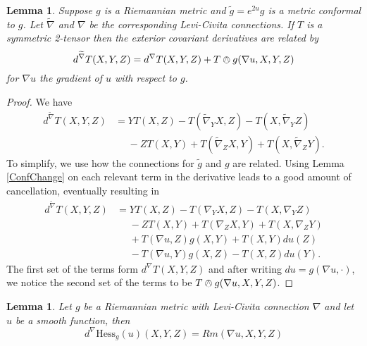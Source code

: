 \documentclass{amsart}
\newtheorem{lem}[thm]{Lemma}
\begin{document}
\begin{lem}
\label{dRel}
Suppose $g$ is a Riemannian metric and $\tilde{g} = e^{2u}g$ is a metric conformal to $g$. Let $\widetilde{\nabla}$ and $\nabla$ be the corresponding Levi-Civita connections. 
If $T$ is a symmetric 2-tensor then the exterior covariant derivatives are related by 
\[
d^{\widetilde{\nabla}} T(X,Y,Z) = d^\nabla T(X,Y,Z) + T \owedge g (\nabla u ,X,Y,Z)
\]
for $\nabla u$ the gradient of $u$ with respect to $g$.
\end{lem}
\begin{proof}
We have
\begin{align*}
d^{\widetilde{\nabla}}T(X,Y,Z)
&= YT(X,Z) - T(\widetilde{\nabla}_YX,Z) - T(X, \widetilde{\nabla}_YZ) \\
&\phantom{=} - ZT(X,Y) + T(\widetilde{\nabla}_ZX,Y) + T(X,\widetilde{\nabla}_ZY).
\end{align*}
To simplify, we use how the connections for $\tilde{g}$ and $g$ are related.
Using Lemma \ref{ConfChange} on each relevant term in the derivative leads to a good amount of cancellation, eventually resulting in 
\begin{align*}
d^{\widetilde{\nabla}}T(X,Y,Z)
&=YT(X,Z) - T(\nabla_YX,Z) - T(X, \nabla_YZ) \\
&\phantom{=} - ZT(X,Y) + T(\nabla_ZX,Y) + T(X,\nabla_ZY) \\
&\phantom{=} + T(\nabla u ,Z)g(X,Y) + T(X,Y)du(Z) \\
&\phantom{=} - T(\nabla u, Y)g(X,Z) - T(X,Z)du(Y).
\end{align*}
The first set of the terms form $d^\nabla T(X,Y,Z)$ and after writing $du = g(\nabla u , \cdot)$, we notice the second set of the terms to be $T\owedge g(\nabla u ,X,Y,Z)$.
\end{proof}

\begin{lem}
\label{Hess}
Let $g$ be a Riemannian metric with Levi-Civita connection $\nabla$ and let $u$ be a smooth function, then
\[
d^\nabla \mathrm{Hess}_g(u) (X,Y,Z) = Rm(\nabla u, X, Y, Z)
\]
\end{lem}
\end{document}
